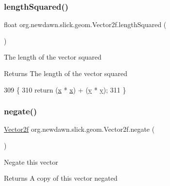 \subsubsection{\texorpdfstring{length\+Squared()}{lengthSquared()}}
{\footnotesize\ttfamily float org.\+newdawn.\+slick.\+geom.\+Vector2f.\+length\+Squared (\begin{DoxyParamCaption}{ }\end{DoxyParamCaption})\hspace{0.3cm}{\ttfamily [inline]}}

The length of the vector squared

\begin{DoxyReturn}{Returns}
The length of the vector squared 
\end{DoxyReturn}

\begin{DoxyCode}
309                                  \{
310         \textcolor{keywordflow}{return} (\mbox{\hyperlink{classorg_1_1newdawn_1_1slick_1_1geom_1_1_vector2f_a3c72cdf13ebc511a472e1a02002fa579}{x}} * \mbox{\hyperlink{classorg_1_1newdawn_1_1slick_1_1geom_1_1_vector2f_a3c72cdf13ebc511a472e1a02002fa579}{x}}) + (\mbox{\hyperlink{classorg_1_1newdawn_1_1slick_1_1geom_1_1_vector2f_aa03914f0c3d32063aa90e5bd7b74688e}{y}} * \mbox{\hyperlink{classorg_1_1newdawn_1_1slick_1_1geom_1_1_vector2f_aa03914f0c3d32063aa90e5bd7b74688e}{y}});
311     \}
\end{DoxyCode}
\mbox{\label{classorg_1_1newdawn_1_1slick_1_1geom_1_1_vector2f_a41f9870f290dbcd797a12ca93988731b}} 
\subsubsection{\texorpdfstring{negate()}{negate()}}
{\footnotesize\ttfamily \mbox{\hyperlink{classorg_1_1newdawn_1_1slick_1_1geom_1_1_vector2f}{Vector2f}} org.\+newdawn.\+slick.\+geom.\+Vector2f.\+negate (\begin{DoxyParamCaption}{ }\end{DoxyParamCaption})\hspace{0.3cm}{\ttfamily [inline]}}

Negate this vector

\begin{DoxyReturn}{Returns}
A copy of this vector negated 
\end{DoxyReturn}

